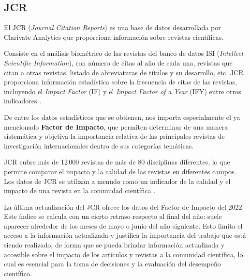 \subsection{JCR}
El JCR (\textit{Journal Citation Reports}) es una base de datos desarrollada por Clarivate Analytics que proporciona información sobre revistas científicas.

Consiste en el análisis biométrico de las revistas del banco de datos ISI (\textit{Intellect Scientific Information}), con número de citas al año de cada una, revistas que citan a otras revistas, listado de abreviaturas de títulos y su desarrollo, etc. JCR proporciona información estadística sobre la frecuencia de citas de las revistas, incluyendo el \textit{Impact Factor} (IF) y el \textit{Impact Factor of a Year} (IFY) entre otros indicadores \cite{clarivate2019}. 

De entre los datos estadísticos que se obtienen, nos importa especialmente el ya mencionado \textbf{Factor de Impacto}, que permiten determinar de una manera sistemática y objetiva la importancia relativa de las principales revistas de investigación internacionales dentro de sus categorías temáticas. 

JCR cubre más de 12\,000 revistas de más de 80 disciplinas diferentes, lo que permite comparar el impacto y la calidad de las revistas en diferentes campos. Los datos de JCR se utilizan a menudo como un indicador de la calidad y el impacto de una revista en la comunidad científica \cite{clarivate2019}.

La última actualización del JCR ofrece los datos del Factor de Impacto del 2022. Este índice se calcula con un cierto retraso respecto al final del año: suele aparecer alrededor de los meses de mayo o junio del año siguiente. Esto limita el acceso a la información actualizada y justifica la importancia del trabajo que está siendo realizado, de forma que se pueda brindar información actualizada y accesible sobre el impacto de los artículos y revistas a la comunidad científica, lo cual es esencial para la toma de decisiones y la evaluación del desempeño científico.